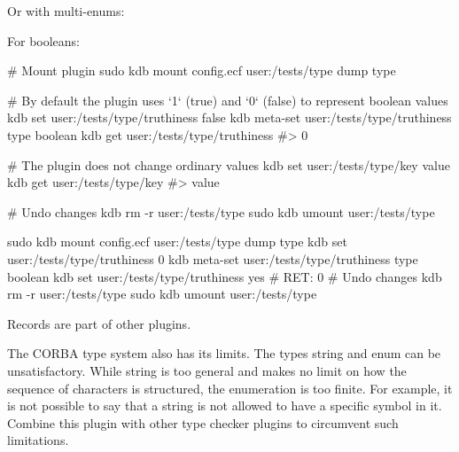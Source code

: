 Or with multi-\/enums\+:




For booleans\+:


\begin{DoxyCode}
# Mount plugin
sudo kdb mount config.ecf user:/tests/type dump type

# By default the plugin uses `1` (true) and `0` (false) to represent boolean values
kdb set user:/tests/type/truthiness false
kdb meta-set user:/tests/type/truthiness type boolean
kdb get user:/tests/type/truthiness
#> 0

# The plugin does not change ordinary values
kdb set user:/tests/type/key value
kdb get user:/tests/type/key
#> value

# Undo changes
kdb rm -r user:/tests/type
sudo kdb umount user:/tests/type
\end{DoxyCode}



\begin{DoxyCode}
sudo kdb mount config.ecf user:/tests/type dump type
kdb set user:/tests/type/truthiness 0
kdb meta-set user:/tests/type/truthiness type boolean
 kdb set user:/tests/type/truthiness yes
# RET: 0
 # Undo changes
kdb rm -r user:/tests/type
sudo kdb umount user:/tests/type
\end{DoxyCode}


Records are part of other plugins.

The {\ttfamily C\+O\+R\+BA} type system also has its limits. The types {\ttfamily string} and {\ttfamily enum} can be unsatisfactory. While string is too general and makes no limit on how the sequence of characters is structured, the enumeration is too finite. For example, it is not possible to say that a string is not allowed to have a specific symbol in it. Combine this plugin with other type checker plugins to circumvent such limitations. 